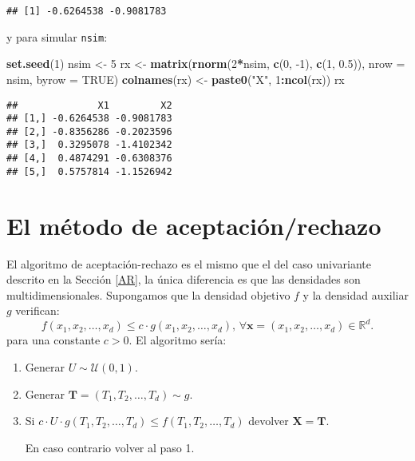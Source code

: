 \documentclass[
]{book}
\newenvironment{Shaded}{\begin{snugshade}}{\end{snugshade}}
\newcommand{\DataTypeTok}[1]{\textcolor[rgb]{0.13,0.29,0.53}{#1}}
\newcommand{\DecValTok}[1]{\textcolor[rgb]{0.00,0.00,0.81}{#1}}
\newcommand{\FloatTok}[1]{\textcolor[rgb]{0.00,0.00,0.81}{#1}}
\newcommand{\KeywordTok}[1]{\textcolor[rgb]{0.13,0.29,0.53}{\textbf{#1}}}
\newcommand{\NormalTok}[1]{#1}
\newcommand{\OperatorTok}[1]{\textcolor[rgb]{0.81,0.36,0.00}{\textbf{#1}}}
\newcommand{\OtherTok}[1]{\textcolor[rgb]{0.56,0.35,0.01}{#1}}
\newcommand{\StringTok}[1]{\textcolor[rgb]{0.31,0.60,0.02}{#1}}
\theoremstyle{break}
\theoremstyle{definition}
\theoremstyle{definition}
\theoremstyle{definition}
\theoremstyle{remark}
\begin{document}
\begin{verbatim}
## [1] -0.6264538 -0.9081783
\end{verbatim}

y para simular \texttt{nsim}:

\begin{Shaded}
\begin{Highlighting}[]
\KeywordTok{set.seed}\NormalTok{(}\DecValTok{1}\NormalTok{)}
\NormalTok{nsim <-}\StringTok{ }\DecValTok{5}
\NormalTok{rx <-}\StringTok{ }\KeywordTok{matrix}\NormalTok{(}\KeywordTok{rnorm}\NormalTok{(}\DecValTok{2}\OperatorTok{*}\NormalTok{nsim, }\KeywordTok{c}\NormalTok{(}\DecValTok{0}\NormalTok{, }\DecValTok{-1}\NormalTok{), }\KeywordTok{c}\NormalTok{(}\DecValTok{1}\NormalTok{, }\FloatTok{0.5}\NormalTok{)), }\DataTypeTok{nrow =}\NormalTok{ nsim, }\DataTypeTok{byrow =} \OtherTok{TRUE}\NormalTok{)}
\KeywordTok{colnames}\NormalTok{(rx) <-}\StringTok{ }\KeywordTok{paste0}\NormalTok{(}\StringTok{"X"}\NormalTok{, }\DecValTok{1}\OperatorTok{:}\KeywordTok{ncol}\NormalTok{(rx))}
\NormalTok{rx}
\end{Highlighting}
\end{Shaded}

\begin{verbatim}
##              X1         X2
## [1,] -0.6264538 -0.9081783
## [2,] -0.8356286 -0.2023596
## [3,]  0.3295078 -1.4102342
## [4,]  0.4874291 -0.6308376
## [5,]  0.5757814 -1.1526942
\end{verbatim}

\hypertarget{el-muxe9todo-de-aceptaciuxf3nrechazo}{%
\section{El método de aceptación/rechazo}\label{el-muxe9todo-de-aceptaciuxf3nrechazo}}

El algoritmo de aceptación-rechazo es el mismo que el del caso univariante descrito en la Sección \ref{AR}, la única diferencia es que las densidades son multidimensionales.
Supongamos que la densidad objetivo \(f\) y la densidad
auxiliar \(g\) verifican:
\[f\left( x_1,x_2,\ldots,x_d\right) \leq c\cdot g\left( x_1,x_2,\ldots,x_d\right) 
\text{, }\forall \mathbf{x} = \left( x_1,x_2,\ldots,x_d\right)\in \mathbb{R}^d\text{.}\]
para una constante \(c>0\).
El algoritmo sería:

\begin{enumerate}
\def\labelenumi{\arabic{enumi}.}
\item
  Generar \(U\sim \mathcal{U}\left( 0,1\right)\).
\item
  Generar \(\mathbf{T} = \left( T_1,T_2,\ldots,T_d\right) \sim g\).
\item
  Si \(c\cdot U\cdot g\left( T_1,T_2,\ldots,T_d\right) \leq f\left( T_1,T_2,\ldots,T_d\right)\)
  devolver \(\mathbf{X}=\mathbf{T}\).

  En caso contrario volver al paso 1.
\end{enumerate}
\end{document}
